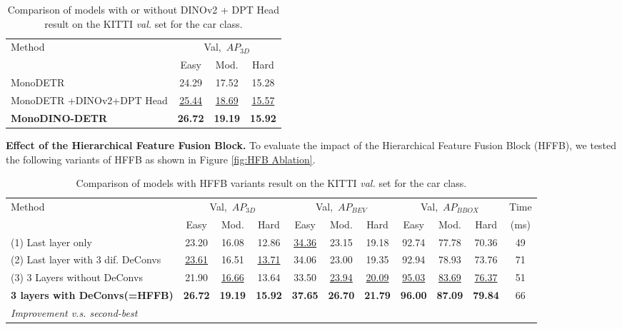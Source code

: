 \begin{table}[h]
\caption[Comparison of models with or without DINOv2 + DPT Head result on the KITTI \textit{val.} set]{Comparison of models with or without DINOv2 + DPT Head result on the KITTI \textit{val.} set for the car class.}
\centering
\small
\begin{tabular}{l|ccc}
\toprule
\multirow{2}{*}{Method} & \multicolumn{3}{c}{Val,\ $AP_{3D}$} \\
& Easy & Mod. & Hard \\
\midrule
MonoDETR\cite{zhang2023monodetr} & 24.29 & 17.52 & 15.28 \\
MonoDETR {\small +DINOv2+DPT Head} & \underline{25.44} & \underline{18.69} & \underline{15.57} \\
\textbf{MonoDINO-DETR} & \textbf{26.72} & \textbf{19.19} & \textbf{15.92} \\
\bottomrule
\end{tabular}
\label{tab:Ablation1_KITTI}
\end{table}

\textbf{Effect of the Hierarchical Feature Fusion Block.} To evaluate the impact of the Hierarchical Feature Fusion Block (HFFB), we tested the following variants of HFFB as shown in Figure \ref{fig:HFB Ablation}.

\begin{table*}[h]
\caption[Comparison of models with HFFB variants result on the KITTI \textit{val.} set]{Comparison of models with HFFB variants result on the KITTI \textit{val.} set for the car class.}
\centering
\small
\begin{tabular}{l|ccc|ccc|ccc|c}
	\toprule
\multirow{2}{*}{Method} & \multicolumn{3}{c|}{Val,\ $AP_{3D}$} & \multicolumn{3}{c|}{Val,\ $AP_{BEV}$} & \multicolumn{3}{c|}{Val,\ $AP_{BBOX}$} & Time \\ 
& Easy & Mod. & Hard & Easy & Mod. & Hard & Easy & Mod. & Hard & (ms) \\
\midrule
(1) Last layer only & 23.20 & 16.08 & 12.86 & \underline{34.36} & 23.15 & 19.18 & 92.74 & 77.78 & 70.36 & 49 \\
(2) Last layer with 3 dif. DeConvs & \underline{23.61} & 16.51 & \underline{13.71} & 34.06 & 23.00 & 19.35 & 92.94 & 78.93 & 73.76 & 71 \\
(3) 3 Layers without DeConvs & 21.90 & \underline{16.66} & 13.64 & 33.50 & \underline{23.94} & \underline{20.09} & \underline{95.03} & \underline{83.69} & \underline{76.37} &  51 \\
\midrule
\textbf{3 layers with DeConvs(=HFFB)}  & \textbf{26.72} & \textbf{19.19} & \textbf{15.92} & \textbf{37.65} & \textbf{26.70} & \textbf{21.79} & \textbf{96.00} & \textbf{87.09} & \textbf{79.84} & 66 \\
\textit{Improvement v.s. second-best} & \color{blue}{+3.11} & \color{blue}{+2.53} & \color{blue}{+2.21} & \color{blue}{+3.29} & \color{blue}{+2.76} & \color{blue}{+1.70} & \color{blue}{+0.97} & \color{blue}{+3.40} & \color{blue}{+3.47} & \\
\bottomrule
\end{tabular}
\label{tab:Ablation2_KITTI}
\end{table*}

